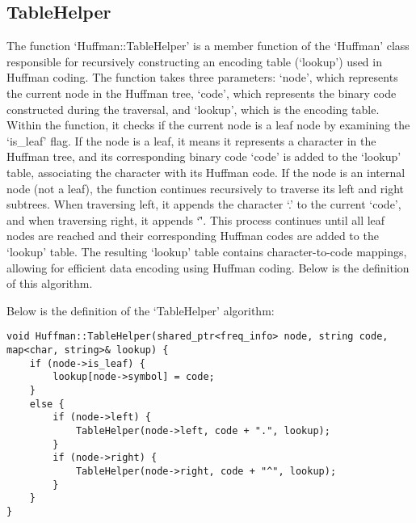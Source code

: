 \subsection*{TableHelper}

The function `Huffman::TableHelper' is a member function of the `Huffman' class responsible for recursively constructing an encoding table (`lookup') used in Huffman coding. The function takes three parameters: 
`node', which represents the current node in the Huffman tree, `code', which represents the binary code constructed during the traversal, and `lookup', which is the encoding table. Within the function, it checks 
if the current node is a leaf node by examining the `is\_leaf' flag. If the node is a leaf, it means it represents a character in the Huffman tree, and its corresponding binary code `code' is added to the `lookup' 
table, associating the character with its Huffman code. If the node is an internal node (not a leaf), the function continues recursively to traverse its left and right subtrees. When traversing left, it appends the 
character `.' to the current `code', and when traversing right, it appends `\^'. This process continues until all leaf nodes are reached and their corresponding Huffman codes are added to the `lookup' table. The 
resulting `lookup' table contains character-to-code mappings, allowing for efficient data encoding using Huffman coding. Below is the definition of this algorithm.

\begin{highlight}
    
Below is the definition of the `TableHelper' algorithm:

\horizontalline

\begin{verbatim}
void Huffman::TableHelper(shared_ptr<freq_info> node, string code, map<char, string>& lookup) {
    if (node->is_leaf) {
        lookup[node->symbol] = code;
    }
    else {
        if (node->left) {
            TableHelper(node->left, code + ".", lookup);
        }
        if (node->right) {
            TableHelper(node->right, code + "^", lookup);
        }
    }
}
\end{verbatim}

\end{highlight}